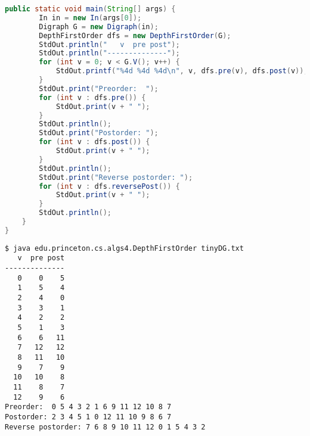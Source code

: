 \documentclass[8pt,a4paper,compress]{beamer}
\begin{document}
\begin{frame}[fragile]
\pause

\begin{lstlisting}[language=java,style=focusin]
    public static void main(String[] args) {
        In in = new In(args[0]);
        Digraph G = new Digraph(in);
        DepthFirstOrder dfs = new DepthFirstOrder(G);
        StdOut.println("   v  pre post");
        StdOut.println("--------------");
        for (int v = 0; v < G.V(); v++) {
            StdOut.printf("%4d %4d %4d\n", v, dfs.pre(v), dfs.post(v));
        }
        StdOut.print("Preorder:  ");
        for (int v : dfs.pre()) {
            StdOut.print(v + " ");
        }
        StdOut.println();
        StdOut.print("Postorder: ");
        for (int v : dfs.post()) {
            StdOut.print(v + " ");
        }
        StdOut.println();
        StdOut.print("Reverse postorder: ");
        for (int v : dfs.reversePost()) {
            StdOut.print(v + " ");
        }
        StdOut.println();
    }
}
\end{lstlisting}
\end{frame}

\begin{frame}[fragile]
\pause

\begin{lstlisting}[language={},style=focusin]
$ java edu.princeton.cs.algs4.DepthFirstOrder tinyDG.txt 
   v  pre post
--------------
   0    0    5
   1    5    4
   2    4    0
   3    3    1
   4    2    2
   5    1    3
   6    6   11
   7   12   12
   8   11   10
   9    7    9
  10   10    8
  11    8    7
  12    9    6
Preorder:  0 5 4 3 2 1 6 9 11 12 10 8 7 
Postorder: 2 3 4 5 1 0 12 11 10 9 8 6 7 
Reverse postorder: 7 6 8 9 10 11 12 0 1 5 4 3 2 
\end{lstlisting}
\end{frame}
\end{document}
